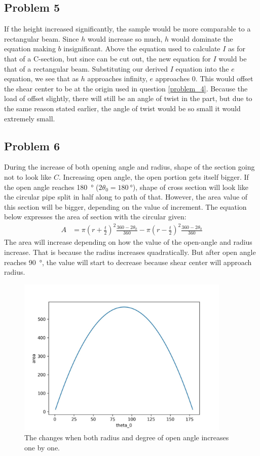 \documentclass[12 pt]{report}
\begin{document}
\subsection{Problem 5}

If the height increased significantly, the sample would be more comparable to a rectangular beam. Since $h$ would increase so much, $h$ would dominate the equation making $b$ insignificant. Above the equation used to calculate $I$ as for that of a C-section, but since can be cut out, the new equation for $I$ would be that of a rectangular beam. Substituting our derived $I$ equation into the $e$ equation, we see that as $h$ approaches infinity, $e$ approaches \num{0}. This would offset the shear center to be at the origin used in question \ref{problem_4}. Because the load of offset slightly, there will still be an angle of twist in the part, but due to the same reason stated earlier, the angle of twist would be so small it would extremely small.

\subsection{Problem 6}

During the increase of both opening angle and radius, shape of the section going not to look like $C$. Increasing open angle, the open portion gets itself bigger. If the open angle reaches \qty{180}{\degree} ($2\theta_0=\qty{180}{\degree}$), shape of cross section will look like the circular pipe split in half along to path of that. However, the area value of this section will be bigger, depending on the value of increment. The equation below expresses the area of section with the circular given:
\begin{align*}
	A&=\pi\left(r+\frac{t}{2}\right)^2\frac{360-2\theta_0}{360}-\pi\left(r-\frac{t}{2}\right)^2\frac{360-2\theta_0}{360}
\end{align*}
The area will increase depending on how the value of the open-angle and radius increase. That is because the radius increases quadratically. But after open angle reaches \qty{90}{\degree}, the value will start to decrease because shear center will approach radius.

\begin{figure}[htbp]
	\centering
	\includegraphics[width=4in]{images/Graphs/random_graph}
	\caption{The changes when both radius and degree of open angle increases one by one.}
	\label{fig:random_graph}
\end{figure}
\end{document}
